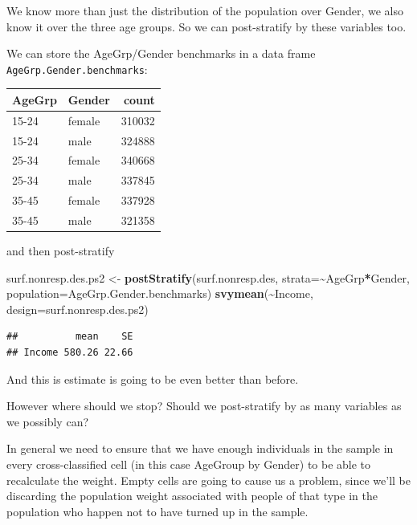 \documentclass[
]{book}
\newenvironment{Shaded}{\begin{snugshade}}{\end{snugshade}}
\newcommand{\AttributeTok}[1]{\textcolor[rgb]{0.13,0.29,0.53}{#1}}
\newcommand{\FunctionTok}[1]{\textcolor[rgb]{0.13,0.29,0.53}{\textbf{#1}}}
\newcommand{\NormalTok}[1]{#1}
\newcommand{\OtherTok}[1]{\textcolor[rgb]{0.56,0.35,0.01}{#1}}
\newcommand{\SpecialCharTok}[1]{\textcolor[rgb]{0.81,0.36,0.00}{\textbf{#1}}}
\begin{document}
We know more than just the distribution of the population over Gender, we also know it over the
three age groups. So we can post-stratify by these variables too.

We can store the AgeGrp/Gender benchmarks in a data frame \texttt{AgeGrp.Gender.benchmarks}:

\begin{table}
\centering
\begin{tabular}[t]{l|l|r}
\hline
AgeGrp & Gender & count\\
\hline
15-24 & female & 310032\\
\hline
15-24 & male & 324888\\
\hline
25-34 & female & 340668\\
\hline
25-34 & male & 337845\\
\hline
35-45 & female & 337928\\
\hline
35-45 & male & 321358\\
\hline
\end{tabular}
\end{table}

and then post-stratify

\begin{Shaded}
\begin{Highlighting}[]
\NormalTok{surf.nonresp.des.ps2 }\OtherTok{\textless{}{-}} \FunctionTok{postStratify}\NormalTok{(surf.nonresp.des, }\AttributeTok{strata=}\SpecialCharTok{\textasciitilde{}}\NormalTok{AgeGrp}\SpecialCharTok{*}\NormalTok{Gender, }
                                     \AttributeTok{population=}\NormalTok{AgeGrp.Gender.benchmarks)}
\FunctionTok{svymean}\NormalTok{(}\SpecialCharTok{\textasciitilde{}}\NormalTok{Income, }\AttributeTok{design=}\NormalTok{surf.nonresp.des.ps2)}
\end{Highlighting}
\end{Shaded}

\begin{verbatim}
##          mean    SE
## Income 580.26 22.66
\end{verbatim}

And this is estimate is going to be even better than before.

However where should we stop? Should we post-stratify by as many variables as we
possibly can?

In general we need to ensure that we have enough individuals in the sample
in every cross-classified cell (in this case AgeGroup by Gender) to be able to
recalculate the weight. Empty cells are going to cause us a problem,
since we'll be discarding the population weight associated
with people of that type in the population who happen not to have turned up in the sample.
\end{document}
